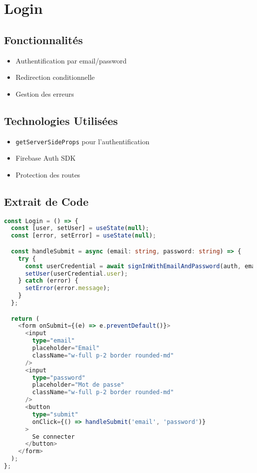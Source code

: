 \documentclass[12pt,a4paper]{report}
\begin{document}
\section{Login}
\subsection{Fonctionnalités}
\begin{itemize}
\item Authentification par email/password
\item Redirection conditionnelle
\item Gestion des erreurs
\end{itemize}

\subsection{Technologies Utilisées}
\begin{itemize}
\item \texttt{getServerSideProps} pour l'authentification
\item Firebase Auth SDK
\item Protection des routes
\end{itemize}

\subsection{Extrait de Code}
\begin{lstlisting}[language=TypeScript,caption=Authentification]
const Login = () => {
  const [user, setUser] = useState(null);
  const [error, setError] = useState(null);

  const handleSubmit = async (email: string, password: string) => {
    try {
      const userCredential = await signInWithEmailAndPassword(auth, email, password);
      setUser(userCredential.user);
    } catch (error) {
      setError(error.message);
    }
  };

  return (
    <form onSubmit={(e) => e.preventDefault()}>
      <input 
        type="email" 
        placeholder="Email" 
        className="w-full p-2 border rounded-md"
      />
      <input 
        type="password" 
        placeholder="Mot de passe" 
        className="w-full p-2 border rounded-md"
      />
      <button 
        type="submit" 
        onClick={() => handleSubmit('email', 'password')}
      >
        Se connecter
      </button>
    </form>
  );
};
\end{lstlisting}
\end{document}
